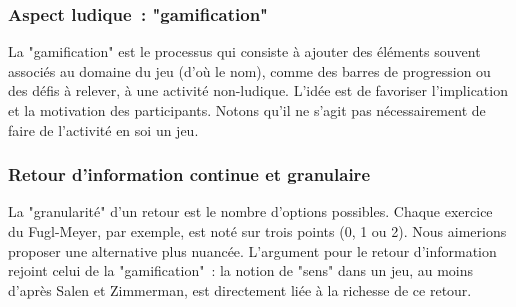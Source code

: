     \subsubsection{Aspect ludique~: "gamification"}
    La "gamification" est le processus qui consiste à ajouter des éléments 
    souvent associés au domaine du jeu (d'où le nom), comme des barres de
    progression ou des défis à relever, à une activité non-ludique. L'idée est 
    de favoriser l'implication et la motivation des participants. 
    Notons qu'il ne s'agit pas nécessairement de faire de l'activité en soi un 
    jeu.
    \subsubsection{Retour d'information continue et granulaire}
    La "granularité" d'un retour est le nombre d'options possibles. 
    Chaque exercice du Fugl-Meyer, par exemple, est noté sur trois points 
    (0, 1 ou 2). Nous 
    aimerions proposer une alternative plus nuancée.
    L'argument pour le retour d'information rejoint celui de la "gamification"~:
    la notion de "sens" dans un jeu, au moins d'après Salen et 
    Zimmerman\cite{rules_of_play}, est 
    directement liée à la richesse de ce retour.

